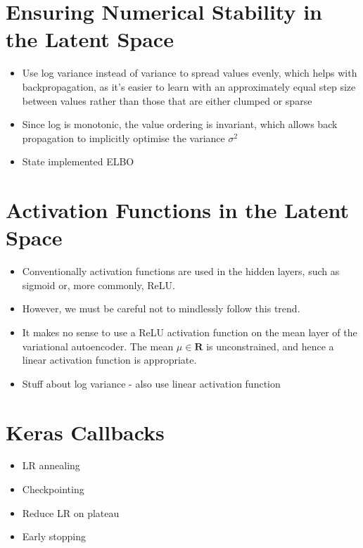 %
%
%
%
%
\section{Ensuring Numerical Stability in the Latent Space}
\begin{itemize}
\item Use log variance instead of variance to spread values evenly, which helps with backpropagation, as it's easier to learn with an approximately equal step size between values rather than those that are either clumped or sparse
\item Since log is monotonic, the value ordering is invariant, which allows back propagation to implicitly optimise the variance $\sigma^2$
\item State implemented ELBO
\end{itemize}



%
%
%
%
%
\section{Activation Functions in the Latent Space}
\begin{itemize}
\item Conventionally activation functions are used in the hidden layers, such as sigmoid or, more commonly, ReLU.
\item However, we must be careful not to mindlessly follow this trend.
\item It makes no sense to use a ReLU activation function on the mean layer of the variational autoencoder. The mean $\mu \in \mathbf{R}$ is unconstrained, and hence a linear activation function is appropriate.
\item Stuff about log variance - also use linear activation function
\end{itemize}



%
%
%
%
%
\section{Keras Callbacks}
\begin{itemize}
\item LR annealing
\item Checkpointing
\item Reduce LR on plateau
\item Early stopping
\end{itemize}